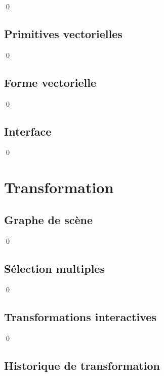 \documentclass[12pt]{article}
\newcommand{\state}{\noindent}
\begin{document}
\state

\qed

\subsection{Primitives vectorielles}

\state

\qed

\subsection{Forme vectorielle}

\state

\qed

\subsection{Interface}

\state

\qed

\pagebreak

\section{Transformation}

\subsection{Graphe de scène}

\state

\qed

\subsection{Sélection multiples}

\state

\qed

\subsection{Transformations interactives}

\state

\qed


\subsection{Historique de transformation}

\state
\end{document}
